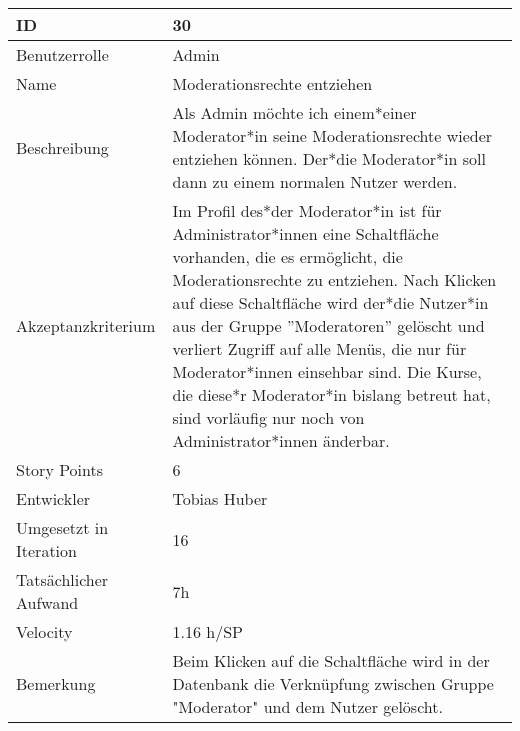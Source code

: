 \begin{tabularx}{\textwidth}{|p{}|X|}
	\hline
	ID & 30 \\
	\hline
	Benutzerrolle & Admin \\
	\hline
	Name & Moderationsrechte entziehen\\
	\hline
	Beschreibung & Als Admin möchte ich einem*einer Moderator*in seine Moderationsrechte wieder entziehen können. Der*die Moderator*in soll dann zu einem normalen Nutzer werden. \\
	\hline
	Akzeptanzkriterium & Im Profil des*der Moderator*in ist für Administrator*innen eine Schaltfläche vorhanden, die es ermöglicht, die Moderationsrechte zu entziehen. Nach Klicken auf diese Schaltfläche wird der*die Nutzer*in aus der Gruppe ''Moderatoren'' gelöscht und verliert Zugriff auf alle Menüs, die nur für Moderator*innen einsehbar sind. Die Kurse, die diese*r Moderator*in bislang betreut hat, sind vorläufig nur noch von Administrator*innen änderbar. \\
	\hline
	Story Points & 6 \\
	\hline
	Entwickler & Tobias Huber \\
	\hline
	Umgesetzt in Iteration & 16\\
	\hline
	Tatsächlicher Aufwand & 7h\\
	\hline
	Velocity & 1.16 h/SP \\
	\hline
	Bemerkung & Beim Klicken auf die Schaltfläche wird in der Datenbank die Verknüpfung zwischen Gruppe "Moderator" und dem Nutzer gelöscht.\\
	\hline
\end{tabularx}
\vspace{20pt}
